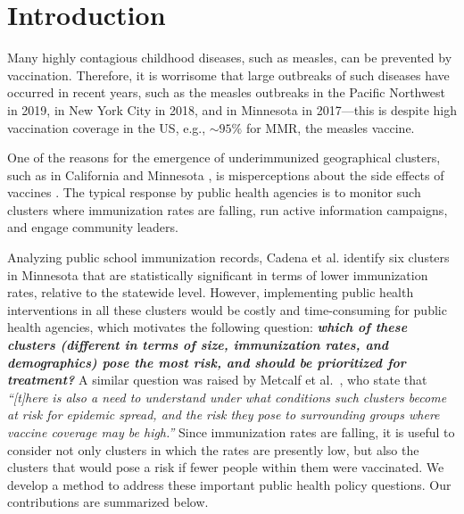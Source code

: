 \section{Introduction}
Many highly contagious childhood diseases, such as measles, can be prevented by
vaccination. Therefore, it is worrisome that large outbreaks of such diseases 
have occurred in recent years, such as the measles
outbreaks in the Pacific Northwest in 2019, in New York City in 2018, and in Minnesota in 2017---this is
despite high vaccination coverage in the US, e.g., $\sim 95\%$ for MMR, the measles vaccine.


One of the reasons for the emergence of underimmunized geographical clusters, such as in California \cite{lieu2015geographic}
and Minnesota \cite{cadena:vacc-cluster}, is misperceptions about the
side effects of vaccines \cite{atwell:pediatrics13}. The typical response by public health agencies is to monitor such clusters where immunization rates are falling, run active information campaigns, and engage community leaders. 

Analyzing public school immunization records, Cadena et al. \cite{cadena:vacc-cluster} identify six clusters in Minnesota that are statistically significant in terms of lower immunization rates, relative to the statewide level. However, implementing public health interventions in all these clusters would be costly and time-consuming for
public health agencies, which motivates the following question: \textbf{\emph{which of these clusters (different
in terms of size, immunization rates, and demographics) pose the most risk, and should be prioritized for treatment?}}
A similar question was raised by Metcalf et al.~\cite{metcalf:epidemics15}, who state that \emph{``[t]here is also a need to understand under what conditions such clusters become at 
risk for epidemic spread, and the risk they pose to surrounding groups where vaccine coverage may be high.''} 
Since immunization rates are falling, it is useful to consider not only clusters in which the rates are presently low, but also the clusters that would pose a risk if fewer people within them were vaccinated.
We develop a method to address these important public health policy questions. Our contributions are summarized below.
\smallskip


